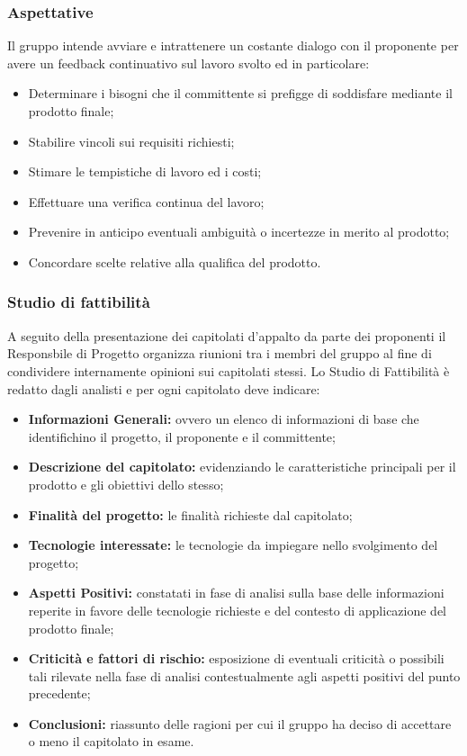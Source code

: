 \subsubsection{Aspettative}
Il gruppo intende avviare e intrattenere un costante dialogo con il proponente per avere un feedback continuativo sul lavoro svolto ed in particolare:
\begin{itemize}
  \item Determinare i bisogni che il committente si prefigge di soddisfare mediante il prodotto finale;
  \item Stabilire vincoli sui requisiti richiesti;
  \item Stimare le tempistiche di lavoro ed i costi;
  \item Effettuare una verifica continua del lavoro;
  \item Prevenire in anticipo eventuali ambiguità o incertezze in merito al prodotto;
  \item Concordare scelte relative alla qualifica del prodotto.
\end{itemize}

\subsubsection{Studio di fattibilità}
\label{_studioDiFattibilita}
A seguito della presentazione dei capitolati d'appalto da parte dei proponenti il Responsbile di Progetto organizza riunioni tra i membri del gruppo al fine di condividere internamente opinioni sui capitolati stessi.
Lo Studio di Fattibilità è redatto dagli analisti e per ogni capitolato deve indicare:
\begin{itemize}
  \item \textbf{Informazioni Generali:} ovvero un elenco di informazioni di base che identifichino il progetto, il proponente e il committente;
  \item \textbf{Descrizione del capitolato:}  evidenziando le caratteristiche principali per il prodotto e gli obiettivi dello stesso;
  \item \textbf {Finalità del progetto:} le finalità richieste dal capitolato;
  \item \textbf {Tecnologie interessate:} le tecnologie da impiegare nello svolgimento del progetto;
  \item \textbf{Aspetti Positivi:} constatati in fase di analisi sulla base delle informazioni reperite in favore delle tecnologie richieste e del contesto di applicazione del prodotto finale;
  \item \textbf{Criticità e fattori di rischio:} esposizione di eventuali criticità o possibili tali rilevate nella fase di analisi contestualmente agli aspetti positivi del punto precedente;
  \item \textbf{Conclusioni:} riassunto delle ragioni per cui il gruppo ha deciso di accettare o meno il capitolato in esame.
\end{itemize}

